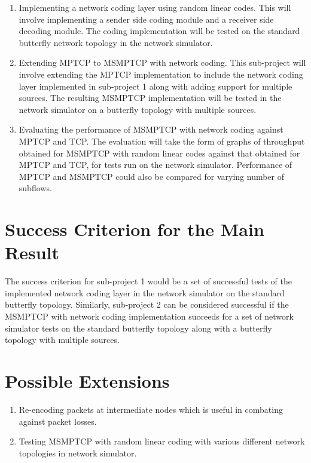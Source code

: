\documentclass[12pt,a4paper,twoside]{article}
\begin{document}
\begin{enumerate}
  \item Implementing a network coding layer using random linear codes. This will involve implementing a sender side coding module and a receiver side decoding module. The coding implementation will be tested on the standard butterfly network topology in the network simulator. 
  \item Extending MPTCP to MSMPTCP with network coding. This sub-project will involve extending the MPTCP implementation to include the network coding layer implemented in sub-project 1 along with adding support for multiple sources. The resulting MSMPTCP implementation will be tested in the network simulator on a butterfly topology with multiple sources. 
  \item Evaluating the performance of MSMPTCP with network coding against MPTCP and TCP. The evaluation will take the form of graphs of throughput obtained for MSMPTCP with random linear codes against that obtained for MPTCP and TCP, for tests run on the network simulator. Performance of MPTCP and MSMPTCP could also be compared for varying number of subflows. 
\end{enumerate}

\section*{Success Criterion for the Main Result}

The success criterion for sub-project 1 would be a set of successful tests of the implemented network coding layer in the network simulator on the standard butterfly topology. Similarly, sub-project 2 can be considered successful if the MSMPTCP with network coding implementation succeeds for a set of network simulator tests on the standard butterfly topology along with a butterfly topology with multiple sources. 

\section*{Possible Extensions}

\begin{enumerate}
  \item Re-encoding packets at intermediate nodes which is useful in combating against packet losses.
  \item Testing MSMPTCP with random linear coding with various different network topologies in network simulator.
\end{enumerate}
\end{document}
